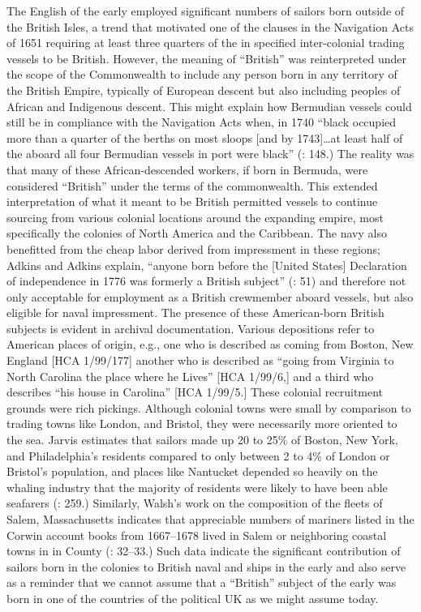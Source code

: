 The English  of the early  employed significant numbers of sailors born outside of the British Isles, a trend that motivated one of the clauses in the Navigation Acts of 1651 requiring at least three quarters of the  in specified inter-colonial trading vessels to be British. However, the meaning of “British” was reinterpreted under the scope of the Commonwealth to include any person born in any territory of the British Empire, typically of European descent but also including peoples of African and Indigenous descent. This might explain how Bermudian vessels could still be in compliance with the Navigation Acts when, in 1740 “black  occupied more than a quarter of the berths on most sloops [and by 1743]…at least half of the  aboard all four Bermudian vessels in port were black” (\citealt{Jarvis2010}: 148.) The reality was that many of these African-descended workers, if born in Bermuda, were considered “British” under the terms of the commonwealth. This extended interpretation of what it meant to be British permitted  vessels to continue sourcing  from various colonial locations around the expanding empire, most specifically the colonies of North America and the Caribbean. The navy also benefitted from the cheap labor derived from impressment in these regions; Adkins and Adkins explain, “anyone born before the [United States] Declaration of independence in 1776 was formerly a British subject” (\citeyear*{AdkinsAdkins2008}: 51) and therefore not only acceptable for employment as a British crewmember aboard  vessels, but also eligible for naval impressment. The presence of these American-born British subjects is evident in archival documentation. Various depositions refer to American places of origin, e.g., one  who is described as coming from Boston, New England [HCA 1/99/177] another who is described as “going from Virginia to North Carolina the place where he Lives” [HCA 1/99/6,] and a third who describes “his house in Carolina” [HCA 1/99/5.] These colonial recruitment grounds were rich pickings. Although colonial towns were small by comparison to trading towns like London,  and Bristol, they were necessarily more oriented to the sea. Jarvis estimates that sailors made up 20 to 25\% of Boston, New York, and Philadelphia’s residents compared to only between 2 to 4\% of London or Bristol’s population, and places like Nantucket depended so heavily on the whaling industry that the majority of residents were likely to have been able seafarers (\citealt{Jarvis2010}: 259.) Similarly, Walsh’s work on the composition of the  fleets of Salem, Massachusetts indicates that appreciable numbers of mariners listed in the Corwin account books from 1667--1678 lived in Salem or neighboring coastal towns in in  County (\citealt{Walsh1994}: 32--33.) Such data indicate the significant contribution of sailors born in the colonies to British naval and  ships in the early  and also serve as a reminder that we cannot assume that a “British” subject of the early  was born in one of the countries of the political UK as we might assume today. 

